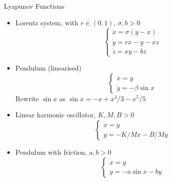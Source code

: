 \documentclass[]{article}
\begin{document}
Lyapunov Functions

\begin{itemize}
\item Lorentz system, with $r \in (0,1)$, $\sigma, b > 0$
$$
\left\{
\begin{matrix}
\dot{x} = \sigma (y - x) \\
\dot{y} = r x - y - xz\\
\dot{z} = xy - bz
\end{matrix}
\right.
$$
\item Pendulum (linearised)
$$
\left\{
\begin{matrix}
\dot{x} = y \\
\dot{y} = -\beta \sin x
\end{matrix}
\right.
$$
Rewrite $\sin x$ as $\sin x = - x + x^3/3 - x^5/5$
\item Linear harmonic oscillator, $K, M, B > 0$
$$
\left\{
\begin{matrix}
\dot{x} = y \\
\dot{y} = -K/M x - B/M y
\end{matrix}
\right.
$$
\item Pendulum with friction, $a, b > 0$
$$
\left\{
\begin{matrix}
\dot{x} = y \\
\dot{y} = - a  \sin x - b y
\end{matrix}
\right.
$$
\end{itemize}
\end{document}
